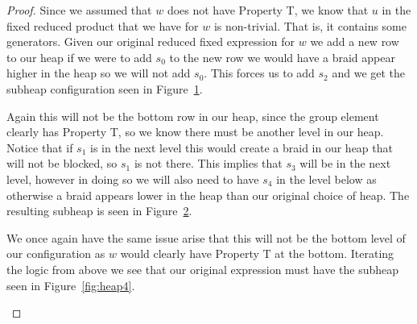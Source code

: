 \begin{theorem}
\begin{proof}
	Since we assumed that $w$ does not have Property T, we know that $u$ in the fixed reduced product that we have for $w$ is non-trivial. That is, it contains some generators. Given our original reduced fixed expression for $w$ we add a new row to our heap if we were to add $s_0$ to the new row we would have a braid appear higher in the heap so we will not add $s_0$. This forces us to add $s_2$ and we get the subheap configuration seen in Figure~\ref{fig:heap2}.  
\begin{figure}[h!]	\centering
{}
\caption{}\label{fig:heap2}
\end{figure}
Again this will not be the bottom row in our heap, since the group element clearly has Property T, so we know there must be another level in our heap. Notice that if $s_1$ is in the next level this would create a braid in our heap that will not be blocked, so $s_1$ is not there. This implies that $s_3$ will be in the next level, however in doing so we will also need to have $s_4$ in the level below as otherwise a braid appears lower in the heap than our original choice of heap. The resulting subheap is seen in Figure~\ref{fig:heap3}. 
\begin{figure}[h!] \centering
{}
\caption{}\label{fig:heap3}
\end{figure}

We once again have the same issue arise that this will not be the bottom level of our configuration as $w$ would clearly have Property T at the bottom. Iterating the logic from above we see that our original expression must have the subheap seen in Figure~\ref{fig:heap4}.
\begin{figure}[h!]\centering
{}
\end{figure}
\end{proof}
\end{theorem}
